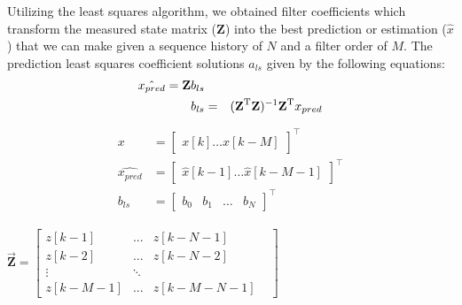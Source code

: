 \documentclass[twocolumn,letterpaper]{IEEEAerospaceCLS}  %
\begin{document}
Utilizing the least squares algorithm, we obtained filter coefficients which transform the measured state matrix (\textbf{Z}) into the best prediction or estimation ($\hat{x}$) that we can make given a sequence history of $N$ and a filter order of $M$. The prediction least squares coefficient solutions $a_{ls}$  given by the following equations:
\begin{eqnarray}
\hat{x_{pred}} = \textbf{Z} b_{ls} \\
b_{ls}&=&(\textbf{Z}^{\rm T}\textbf{Z})^{-1}\textbf{Z}^{\rm T}x_{pred}
\end{eqnarray}
\begin{align}
\begin{aligned}
x&= \left[ \begin{matrix}  x[k]   \dots    x[k-M] \end{matrix} \right]^\top\\
\hat{x_{pred}} &= \left[ \begin{matrix} \hat{x}[k-1]  \dots \hat{x}[k-M-1]\end{matrix} \right]^\top\\
b_{ls}&= \left[ \begin{matrix}   b_{0}   & b_{1}  & \dots &  b_{N}\end{matrix}\right]^\top
\end{aligned}
\end{align}

$\vec{\textbf{Z}} = \begin{bmatrix}
   z[k-1]   & ...       & z[k-N-1]     & \\
   z[k-2]   & ...       & z[k-N-2]     & \\
   \vdots             &  \ddots   &              & \\
   z[k-M-1] & ...       & z[k-M-N-1]  
\end{bmatrix}$
\end{document}
